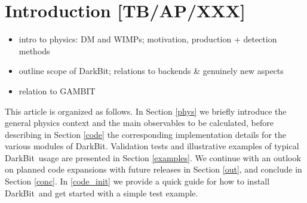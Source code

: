 \date{\today}


\newcommand{\DB}{\mbox{\sf DarkBit}}
\newcommand{\GB}{\mbox{\sf GAMBIT}}


\maketitle

\begin{abstract}

Introducing \DB, physics motivation, main features (flexible and efficient interface; more realistic likelihoods
than typically implemented; further new features?). Mention link to \GB\ but emphasize standalone character. 
List examples for illustration...

\end{abstract}

\section{Introduction [TB/AP/XXX]}
\label{intro}

\begin{itemize}
\item intro to physics: DM and WIMPs; motivation, production + detection methods
\item outline scope of \DB; relations to backends \& genuinely new aspects
\item relation to \GB
\end{itemize}

This article is organized as follows. In Section \ref{phys} we  briefly introduce the general physics 
context and the main  observables to be calculated, before describing in Section \ref{code} the corresponding 
implementation details for the various modules of \DB. Validation tests and illustrative examples of typical
\DB\ usage are presented in Section \ref{examples}. We continue with an outlook on planned code expansions 
with future releases in Section \ref{out}, and conclude in Section \ref{conc}. In \ref{code_init} we provide a quick 
guide for how to install \DB\ and get started with a simple test example.

